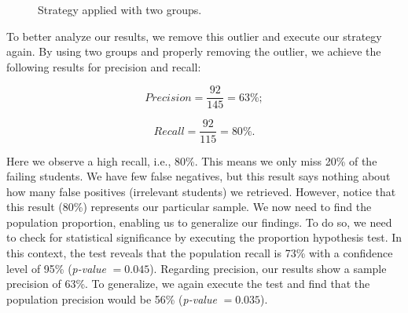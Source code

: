 \begin{figure}[ht]
\begin{center}
{             \label{fig:2-2013-01}
         }
     \end{center}
     \caption{Strategy applied with two groups.}
	 \label{fig:2-groups}
\end{figure}

To better analyze our results, we remove this outlier and execute our strategy again. By using two groups and properly removing the outlier, we achieve the following results for precision and recall:

\vspace{0.2cm}
\noindent
\begin{minipage}{.5\linewidth}
\centering
$$
Precision = \frac{92}{145} = 63\%;
$$
\end{minipage}
\begin{minipage}{.5\linewidth}
$$
Recall = \frac{92}{115} = 80\%.
$$
\end{minipage}
\vspace{0.2cm}

Here we observe a high recall, i.e., 80\%. This means we only miss 20\% of the failing students. We have few false negatives, but this result says nothing about how many false positives (irrelevant students) we retrieved. However, notice that this result (80\%) represents our particular sample. We now need to find the population proportion, enabling us to generalize our findings. To do so, we need to check for statistical significance by executing the proportion hypothesis test. In this context, the test reveals that the population recall is 73\% with a confidence level of 95\% (\textit{p-value} $= 0.045$). Regarding precision, our results show a sample precision of 63\%. To generalize, we again execute the test and find that the population precision would be 56\% (\textit{p-value} $= 0.035$).

